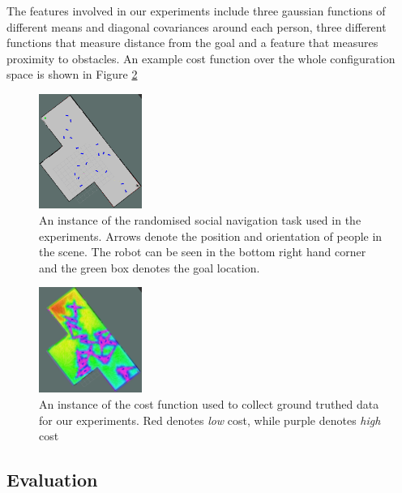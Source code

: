 \documentclass{article}  %
\begin{document}
	The features involved in our experiments include three gaussian functions of different means and diagonal covariances around each person, three different functions that measure distance from the goal and a feature that measures proximity to obstacles. An example cost function over the whole configuration space is shown in Figure \ref{fig:cost_f} 

	\begin{figure}
	\centering
	    \includegraphics[width=0.30\textwidth]{images/people.png}
	  \caption{An instance of the randomised social navigation task used in the experiments. Arrows denote the position and orientation of people in the scene. The robot can be seen in the bottom right hand corner and the green box denotes the goal location.} \label{fig:exp_setting}
	\end{figure}

	\begin{figure}
	\centering
	    \includegraphics[width=0.30\textwidth]{images/cost_f.png}
	  \caption{An instance of the cost function used to collect ground truthed data for our experiments. Red denotes \emph{low} cost, while purple denotes \emph{high} cost} \label{fig:cost_f}
	\end{figure}
	\subsection{Evaluation}
\end{document}
